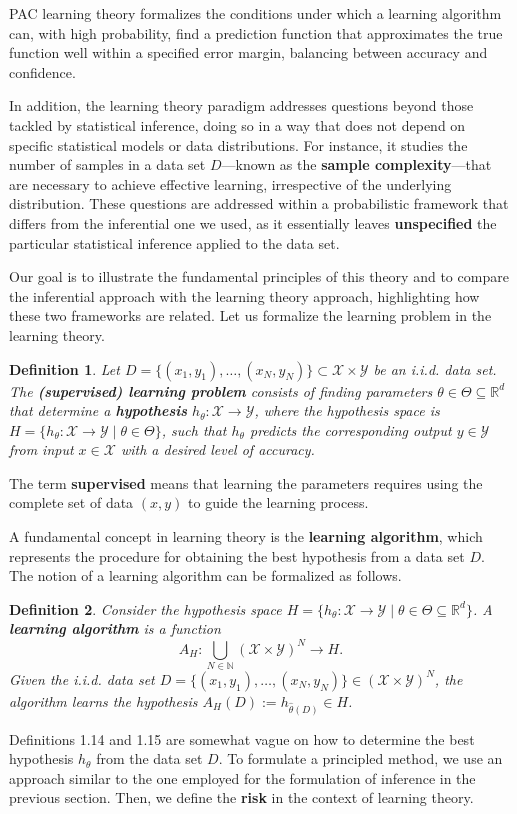 \documentclass{report}
\newtheorem{definition}{Definition}[chapter]
\begin{document}
PAC learning theory formalizes the conditions under which a learning algorithm can, with high probability, find a prediction function that approximates the true  function well within a specified error margin, balancing between accuracy and confidence.

In addition, the learning theory paradigm addresses questions beyond those tackled by statistical inference, doing so in a way that does not depend on specific statistical models or data distributions. For instance, it studies the number of samples in a data set $D$—known as the \textbf{sample complexity}—that are necessary to achieve effective learning, irrespective of the underlying distribution. These questions are addressed within a probabilistic framework that differs from the inferential one we used, as it essentially leaves \textbf{unspecified} the particular statistical inference applied to the data set.

Our goal is to illustrate the fundamental principles of this theory and to compare the inferential approach with the learning theory approach, highlighting how these two frameworks are related. Let us formalize the learning problem in the learning theory.

\begin{definition}
Let $D = \{(x_1,y_1), \dots, (x_N,y_N)\} \subset \mathcal{X} \times \mathcal{Y}$ be an i.i.d. data set. The \textbf{(supervised) learning problem} consists of finding parameters $\theta \in \Theta \subseteq \mathbb{R}^d$ that determine a \textbf{hypothesis} $h_\theta : \mathcal{X} \to \mathcal{Y}$, where the hypothesis space is $H = \{ h_\theta : \mathcal{X} \to \mathcal{Y} \mid \theta \in \Theta \}$, such that $h_\theta$ predicts the corresponding output $y \in \mathcal{Y}$ from input $x \in \mathcal{X}$ with a desired level of accuracy.
\end{definition}
The term \textbf{supervised} means that learning the parameters requires using the complete set of data $(x,y)$ to guide the learning process.

A fundamental concept in learning theory is the \textbf{learning algorithm}, which represents the procedure for obtaining the best hypothesis from a data set $D$. The notion of a learning algorithm can be formalized as follows.

\begin{definition}
Consider the hypothesis space $H = \{h_\theta : \mathcal{X} \to \mathcal{Y} \mid\theta\in\Theta\subseteq\mathbb{R}^d\}$. A \textbf{learning algorithm} is a function \[ A_H : \bigcup_{N \in \mathbb{N}} (\mathcal{X}\times \mathcal{Y}) ^N\to H.\]
Given the  i.i.d. data set $D = \{(x_1,y_1), \dots, (x_N,y_N)\} \in (\mathcal{X} \times \mathcal{Y})^N$, the algorithm learns the hypothesis $A_H(D) := h_{\hat{\theta}(D)} \in H$.
\end{definition}
Definitions 1.14 and 1.15 are somewhat vague on how to determine the best hypothesis $h_\theta$ from the data set $D$. To formulate a principled method, we use an approach similar to the one employed for the formulation of inference in the previous section. Then, we define the \textbf{risk} in the context of learning theory.
\end{document}
